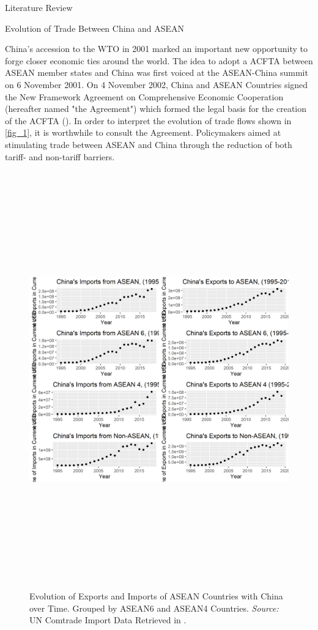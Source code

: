 \begin{section}{Literature Review}

\begin{subsection}{Evolution of Trade Between China and ASEAN}

China’s accession to the WTO in 2001 marked an important new opportunity to forge closer economic ties around the world. The idea to adopt a ACFTA between ASEAN member states and China was first voiced at the ASEAN-China summit on 6 November 2001. On 4 November 2002, China and ASEAN Countries signed the New Framework Agreement on Comprehensive Economic Cooperation (hereafter named "the Agreement") which formed the legal basis for the creation of the ACFTA (\cite{asean_2002_1}). In order to interpret the evolution of trade flows shown in \autoref{fig_1}, it is worthwhile to consult the Agreement. Policymakers aimed at stimulating trade between ASEAN and China through the reduction of both tariff- and non-tariff barriers.

\begin{figure}[H]
	\centering
	\includegraphics[height=18cm,width=\textwidth]{figure_1.png}
	\caption{\small{Evolution of Exports and Imports of ASEAN Countries with China over Time. Grouped by ASEAN6 and ASEAN4 Countries. \textit{Source:} UN Comtrade Import Data Retrieved in \cite{cepii-data_2022}.}}
	\label{fig_1}
\end{figure}


\end{subsection}
\end{section}
